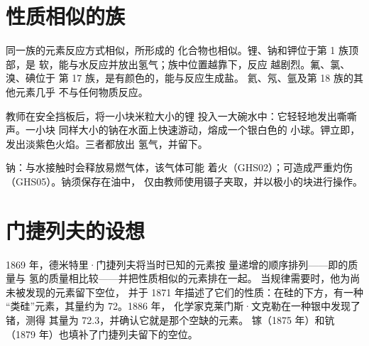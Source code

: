 \section{性质相似的族}

\begin{proposition}[同一族的元素性质相似]\label{prop:g9:periodic-table-first-look:alike}
同一族的元素反应方式相似，所形成的
化合物也相似。锂、钠和钾位于第 1 族顶部，是
软，能与水反应并放出氢气；族中位置越靠下，反应
越剧烈。氟、氯、溴、碘位于
第 17 族，是有颜色的，能与反应生成盐。
氦、氖、氩及第 18 族的其他元素几乎
不与任何物质反应。
\end{proposition}

\begin{inthelab}[锂、钠和钾与水的反应]
教师在安全挡板后，将一小块米粒大小的锂
投入一大碗水中：它轻轻地发出嘶嘶声。一小块
同样大小的钠在水面上快速游动，熔成一个银白色的
小球。钾立即，发出淡紫色火焰。三者都放出
氢气，并留下。
\end{inthelab}

\begin{safety}{}
钠：与水接触时会释放易燃气体，该气体可能
着火（GHS02）；可造成严重灼伤（GHS05）。钠须保存在油中，
仅由教师使用镊子夹取，并以极小的块进行操作。
\end{safety}

\section{门捷列夫的设想}

\begin{history}[门捷列夫留下的空位，1869--1886]
1869 年，德米特里·门捷列夫将当时已知的元素按
量递增的顺序排列——即的质量与
氢的质量相比较——并把性质相似的元素排在一起。
当规律需要时，他为尚未被发现的元素留下空位，
并于 1871 年描述了它们的性质：在硅的下方，有一种
“类硅”元素，其量约为 72。1886 年，
化学家克莱门斯·文克勒在一种银中发现了锗，测得
其量为 72.3，并确认它就是那个空缺的元素。
镓（1875 年）和钪（1879 年）也填补了门捷列夫留下的空位。
\end{history}

